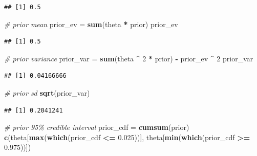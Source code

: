 \documentclass[
]{book}
\newenvironment{Shaded}{\begin{snugshade}}{\end{snugshade}}
\newcommand{\CommentTok}[1]{\textcolor[rgb]{0.56,0.35,0.01}{\textit{#1}}}
\newcommand{\DecValTok}[1]{\textcolor[rgb]{0.00,0.00,0.81}{#1}}
\newcommand{\FloatTok}[1]{\textcolor[rgb]{0.00,0.00,0.81}{#1}}
\newcommand{\KeywordTok}[1]{\textcolor[rgb]{0.13,0.29,0.53}{\textbf{#1}}}
\newcommand{\NormalTok}[1]{#1}
\newcommand{\OperatorTok}[1]{\textcolor[rgb]{0.81,0.36,0.00}{\textbf{#1}}}
\newcommand{\StringTok}[1]{\textcolor[rgb]{0.31,0.60,0.02}{#1}}
\theoremstyle{definition}
\theoremstyle{definition}
\theoremstyle{definition}
\theoremstyle{remark}
\begin{document}
\begin{verbatim}
## [1] 0.5
\end{verbatim}

\begin{Shaded}
\begin{Highlighting}[]
\CommentTok{\# prior mean}
\NormalTok{prior\_ev =}\StringTok{ }\KeywordTok{sum}\NormalTok{(theta }\OperatorTok{*}\StringTok{ }\NormalTok{prior)}
\NormalTok{prior\_ev}
\end{Highlighting}
\end{Shaded}

\begin{verbatim}
## [1] 0.5
\end{verbatim}

\begin{Shaded}
\begin{Highlighting}[]
\CommentTok{\# prior variance}
\NormalTok{prior\_var =}\StringTok{ }\KeywordTok{sum}\NormalTok{(theta }\OperatorTok{\^{}}\StringTok{ }\DecValTok{2} \OperatorTok{*}\StringTok{ }\NormalTok{prior) }\OperatorTok{{-}}\StringTok{ }\NormalTok{prior\_ev }\OperatorTok{\^{}}\StringTok{ }\DecValTok{2}
\NormalTok{prior\_var}
\end{Highlighting}
\end{Shaded}

\begin{verbatim}
## [1] 0.04166666
\end{verbatim}

\begin{Shaded}
\begin{Highlighting}[]
\CommentTok{\# prior sd}
\KeywordTok{sqrt}\NormalTok{(prior\_var)}
\end{Highlighting}
\end{Shaded}

\begin{verbatim}
## [1] 0.2041241
\end{verbatim}

\begin{Shaded}
\begin{Highlighting}[]
\CommentTok{\# prior 95\% credible interval}
\NormalTok{prior\_cdf =}\StringTok{ }\KeywordTok{cumsum}\NormalTok{(prior)}
\KeywordTok{c}\NormalTok{(theta[}\KeywordTok{max}\NormalTok{(}\KeywordTok{which}\NormalTok{(prior\_cdf }\OperatorTok{\textless{}=}\StringTok{ }\FloatTok{0.025}\NormalTok{))], theta[}\KeywordTok{min}\NormalTok{(}\KeywordTok{which}\NormalTok{(prior\_cdf }\OperatorTok{\textgreater{}=}\StringTok{ }\FloatTok{0.975}\NormalTok{))])}
\end{Highlighting}
\end{Shaded}
\end{document}
